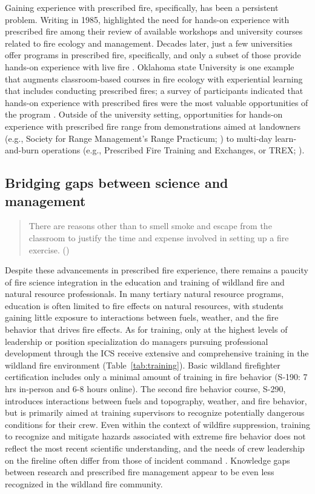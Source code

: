 \documentclass[fire,article,submit,moreauthors,pdftex]{Definitions/mdpi}
\begin{document}
Gaining experience with prescribed fire, specifically, has been a persistent problem.
Writing in 1985, \citet{heitlinger1985} highlighted the need for hands-on experience with prescribed fire among their review of available workshops and university courses related to fire ecology and management.
Decades later, just a few universities offer programs in prescribed fire, specifically, and only a subset of those provide hands-on experience with live fire \citep{kobziar2009}.
Oklahoma state University is one example that augments classroom-based courses in fire ecology with experiential learning that includes conducting prescribed fires; a survey of participants indicated that hands-on experience with prescribed fires were the most valuable opportunities of the program \citep{scasta2015}.
Outside of the university setting, opportunities for hands-on experience with prescribed fire range from demonstrations aimed at landowners (e.g., Society for Range Management's Range Practicum; \citep{barnes2021}) to multi-day learn-and-burn operations (e.g., Prescribed Fire Training and Exchanges, or TREX; \citep{spencer2015}).

\subsection{Bridging gaps between science and management}

\begin{quote}
There are reasons other than to smell smoke and escape from the classroom to justify the time and expense involved in setting up a fire exercise. (\citet[][p.~50]{andrews1989})
\end{quote}

Despite these advancements in prescribed fire experience, there remains a paucity of fire science integration in the education and training of wildland fire and natural resource professionals.
In many tertiary natural resource programs, education is often limited to fire effects on natural resources, with students gaining little exposure to interactions between fuels, weather, and the fire behavior that drives fire effects.
As for training, only at the highest levels of leadership or position specialization do managers pursuing professional development through the ICS receive extensive and comprehensive training in the wildland fire environment (Table~\ref{tab:training}).
Basic wildland firefighter certification includes only a minimal amount of training in fire behavior (S-190: 7 hrs in-person and 6-8 hours online).
The second fire behavior course, S-290, introduces interactions between fuels and topography, weather, and fire behavior, but is primarily aimed at training supervisors to recognize potentially dangerous conditions for their crew.
Even within the context of wildfire suppression, training to recognize and mitigate hazards associated with extreme fire behavior does not reflect the most recent scientific understanding, and the needs of crew leadership on the fireline often differ from those of incident command \citep{werth2016}.
Knowledge gaps between research and prescribed fire management appear to be even less recognized in the wildland fire community.
\end{document}
